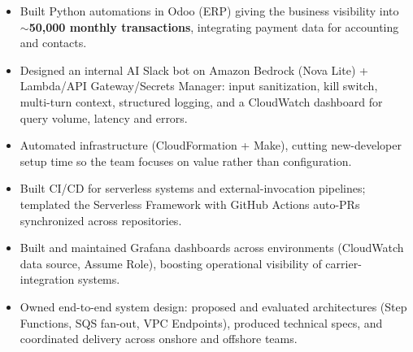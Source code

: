 \documentclass[11pt,a4paper]{article}
\begin{document}
\begin{itemize}
        for billing and operations: traced integrity incidents to their root cause in the pipeline
        --- a month of usage rewritten $\sim$6\% low on \textbf{$\sim$91k lines} by redelivered callbacks,
        stale rate plans on \textbf{$\sim$550k devices} --- and audited per-account usage trends and idle
        active SIMs by customer.
  \item Built Python automations in Odoo (ERP) giving the business visibility into \textbf{$\sim$50,000
        monthly transactions}, integrating payment data for accounting and contacts.
  \item Designed an internal AI Slack bot on Amazon Bedrock (Nova Lite) + Lambda/API Gateway/Secrets
        Manager: input sanitization, kill switch, multi-turn context, structured logging, and a
        CloudWatch dashboard for query volume, latency and errors.
  \item Automated infrastructure (CloudFormation + Make), cutting new-developer setup time so the
        team focuses on value rather than configuration.
  \item Built CI/CD for serverless systems and external-invocation pipelines; templated the
        Serverless Framework with GitHub Actions auto-PRs synchronized across repositories.
  \item Built and maintained Grafana dashboards across environments (CloudWatch data source,
        Assume Role), boosting operational visibility of carrier-integration systems.
  \item Owned end-to-end system design: proposed and evaluated architectures (Step Functions,
        SQS fan-out, VPC Endpoints), produced technical specs, and coordinated delivery across
        onshore and offshore teams.
\end{itemize}
\end{document}
